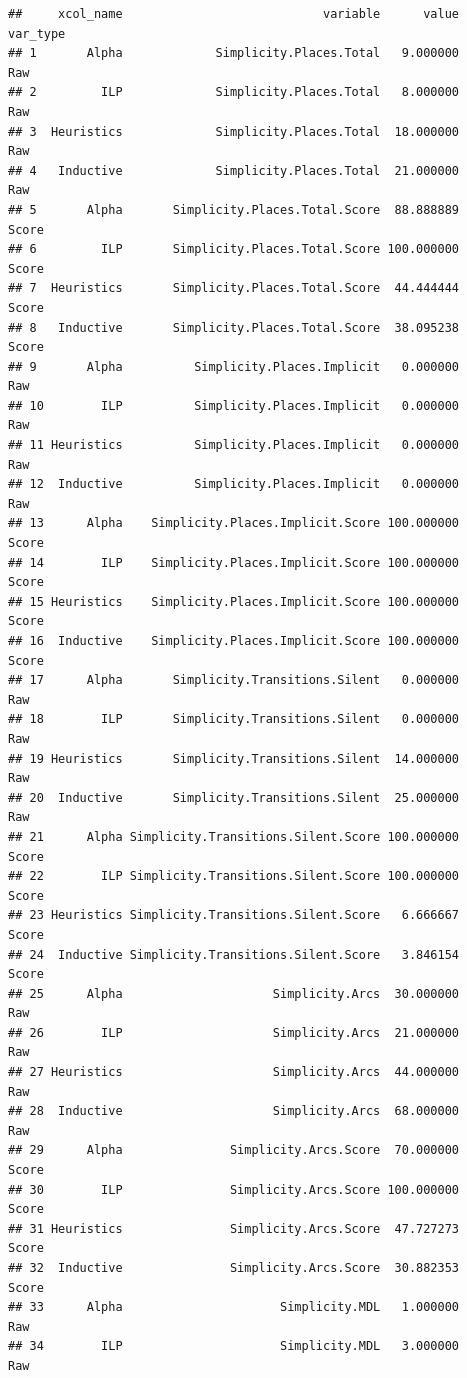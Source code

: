 \documentclass[]{article}
\begin{document}
\begin{verbatim}
##     xcol_name                            variable      value var_type
## 1       Alpha             Simplicity.Places.Total   9.000000      Raw
## 2         ILP             Simplicity.Places.Total   8.000000      Raw
## 3  Heuristics             Simplicity.Places.Total  18.000000      Raw
## 4   Inductive             Simplicity.Places.Total  21.000000      Raw
## 5       Alpha       Simplicity.Places.Total.Score  88.888889    Score
## 6         ILP       Simplicity.Places.Total.Score 100.000000    Score
## 7  Heuristics       Simplicity.Places.Total.Score  44.444444    Score
## 8   Inductive       Simplicity.Places.Total.Score  38.095238    Score
## 9       Alpha          Simplicity.Places.Implicit   0.000000      Raw
## 10        ILP          Simplicity.Places.Implicit   0.000000      Raw
## 11 Heuristics          Simplicity.Places.Implicit   0.000000      Raw
## 12  Inductive          Simplicity.Places.Implicit   0.000000      Raw
## 13      Alpha    Simplicity.Places.Implicit.Score 100.000000    Score
## 14        ILP    Simplicity.Places.Implicit.Score 100.000000    Score
## 15 Heuristics    Simplicity.Places.Implicit.Score 100.000000    Score
## 16  Inductive    Simplicity.Places.Implicit.Score 100.000000    Score
## 17      Alpha       Simplicity.Transitions.Silent   0.000000      Raw
## 18        ILP       Simplicity.Transitions.Silent   0.000000      Raw
## 19 Heuristics       Simplicity.Transitions.Silent  14.000000      Raw
## 20  Inductive       Simplicity.Transitions.Silent  25.000000      Raw
## 21      Alpha Simplicity.Transitions.Silent.Score 100.000000    Score
## 22        ILP Simplicity.Transitions.Silent.Score 100.000000    Score
## 23 Heuristics Simplicity.Transitions.Silent.Score   6.666667    Score
## 24  Inductive Simplicity.Transitions.Silent.Score   3.846154    Score
## 25      Alpha                     Simplicity.Arcs  30.000000      Raw
## 26        ILP                     Simplicity.Arcs  21.000000      Raw
## 27 Heuristics                     Simplicity.Arcs  44.000000      Raw
## 28  Inductive                     Simplicity.Arcs  68.000000      Raw
## 29      Alpha               Simplicity.Arcs.Score  70.000000    Score
## 30        ILP               Simplicity.Arcs.Score 100.000000    Score
## 31 Heuristics               Simplicity.Arcs.Score  47.727273    Score
## 32  Inductive               Simplicity.Arcs.Score  30.882353    Score
## 33      Alpha                      Simplicity.MDL   1.000000      Raw
## 34        ILP                      Simplicity.MDL   3.000000      Raw

\end{verbatim}
\end{document}

